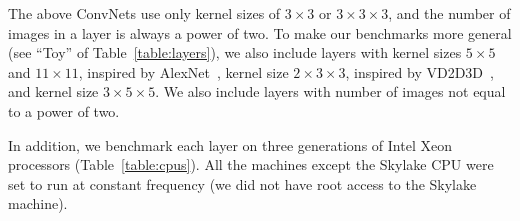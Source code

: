   The above ConvNets use only kernel sizes of $3 \times 3$ or $3\times
  3\times 3$, and the number of images in a layer is always a power of
  two.  To make our benchmarks more general (see ``Toy'' of
  Table~\ref{table:layers}), we also include layers with kernel sizes
  $5 \times 5$ and $11 \times 11$, inspired by
  AlexNet~\cite{krizhevsky2012imagenet}, kernel size $2 \times 3
  \times 3$, inspired by VD2D3D~\cite{lee2015recursive}, and kernel
  size $3 \times 5 \times 5$.  We also include layers with number of
  images not equal to a power of two.

  In addition, we benchmark each layer on three generations
  of Intel Xeon processors (Table~\ref{table:cpus}).  All the machines
  except the Skylake CPU were set to run at constant frequency (we did
  not have root access to the Skylake machine).

